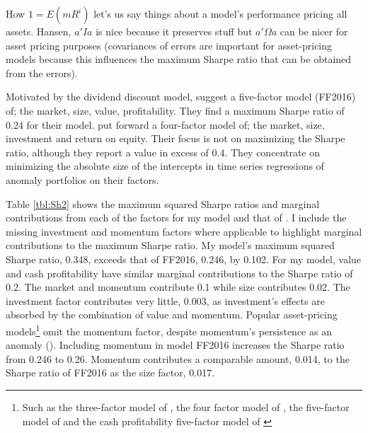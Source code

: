 How $1=E(mR^i)$ let's us say things about a model's performance pricing all 
assets.
Hansen, $a'Ia$ is nice because it preserves stuff but
$a'\Omega a$ can be nicer for asset pricing purposes (covariances of errors 
are important for asset-pricing models because this influences the maximum 
Sharpe ratio that can be obtained from the errors).

Motivated by the dividend discount model, \textcite{fama2016choosing} 
suggest a five-factor model (FF2016) of; the market, size, value, 
profitability.
They find a maximum Sharpe ratio of 0.24 for their model.
\textcite{hou2015digesting} put forward a four-factor model of; the market, 
size, 
investment and return on equity.
Their focus is not on maximizing the Sharpe ratio, although they report a 
value in excess of 0.4.
They concentrate on minimizing the absolute size of the intercepts in time 
series regressions of anomaly portfolios on their factors.

%

Table \ref{tbl:Sh2} shows the maximum squared Sharpe ratios and marginal 
contributions from each of the factors for my model and that of 
\textcite{fama2016choosing}.
I include the missing investment and momentum factors where applicable to 
highlight marginal contributions to the maximum Sharpe ratio.
My model's maximum squared Sharpe ratio, 0.348, exceeds that of FF2016, 0.246, 
by 0.102.
For my model, value and cash profitability have similar marginal 
contributions to the Sharpe ratio of 0.2.
The market and momentum contribute 0.1 while size contributes 0.02.
The investment factor contributes very little, 0.003, as investment's effects 
are absorbed by the combination of value and momentum.
Popular asset-pricing models\footnote{Such as the three-factor model of 
  \textcite{fama1993common}, the four factor model of 
  \textcite{hou2015digesting}, the 
  five-factor model of \textcite{fama2015five} and the cash profitability 
  five-factor model of \textcite{fama2016choosing}} omit the momentum factor, 
despite 
momentum's persistence as an anomaly (\parencite{fama2016dissecting, 
  fama2017international}).
Including momentum in model FF2016 increases the Sharpe ratio from 0.246 
to 0.26.
Momentum contributes a comparable amount, 0.014, to the Sharpe ratio 
of FF2016 as the size factor, 0.017.